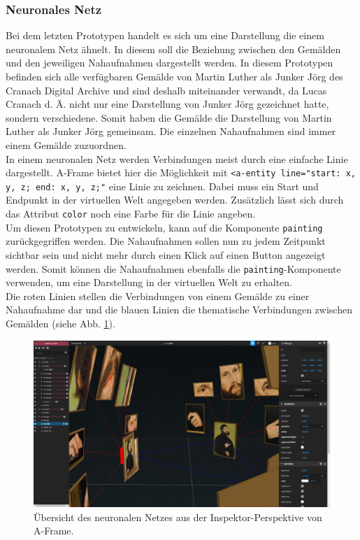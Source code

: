 \documentclass[a4paper,12pt,oneside]{article}
\begin{document}
      \subsubsection{Neuronales Netz}
        Bei dem letzten Prototypen handelt es sich um eine Darstellung die
        einem neuronalem Netz ähnelt. In diesem soll die Beziehung
        zwischen den Gemälden und den jeweiligen Nahaufnahmen dargestellt
        werden. In diesem Prototypen befinden sich alle verfügbaren
        Gemälde von Martin Luther als Junker Jörg des Cranach Digital
        Archive und sind deshalb miteinander verwandt, da Lucas Cranach
        d. Ä. nicht nur eine Darstellung von Junker Jörg gezeichnet hatte,
        sondern verschiedene. Somit haben die Gemälde die Darstellung
        von Martin Luther als Junker Jörg gemeinsam. Die einzelnen
        Nahaufnahmen sind immer einem Gemälde zuzuordnen. \\
        In einem neuronalen Netz werden Verbindungen meist durch eine
        einfache Linie dargestellt. A-Frame bietet hier die Möglichkeit
        mit \texttt{<a-entity line="start: x, y, z; end: x, y, z;"} eine
        Linie zu zeichnen. Dabei muss ein Start und Endpunkt in der
        virtuellen Welt angegeben werden. Zusätzlich lässt sich durch
        das Attribut \texttt{color} noch eine Farbe für die Linie angeben. \\
        Um diesen Prototypen zu entwickeln, kann auf die Komponente
        \texttt{painting} zurückgegriffen werden. Die Nahaufnahmen
        sollen nun zu jedem Zeitpunkt sichtbar sein und nicht mehr
        durch einen Klick auf einen Button angezeigt werden. Somit
        können die Nahaufnahmen ebenfalls die \texttt{painting}-Komponente
        verwenden, um eine Darstellung in der virtuellen Welt zu erhalten. \\
        Die roten Linien stellen die Verbindungen von einem Gemälde zu
        einer Nahaufnahme dar und die blauen Linien die thematische
        Verbindungen zwischen Gemälden 
        (siehe Abb. \ref{fig:neural-network1}).
        \begin{figure}
          \centering
          \includegraphics[scale=0.3]{img/coding/neural-network1.png}
          \caption{Übersicht des neuronalen Netzes aus der Inspektor-Perspektive von A-Frame.}
          \label{fig:neural-network1}
        \end{figure}
\end{document}
